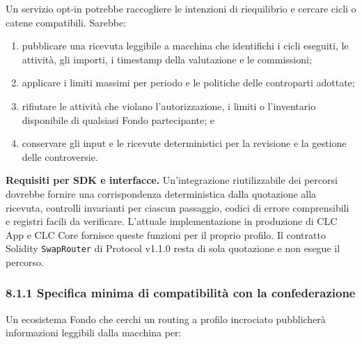 \documentclass[11pt]{article}
\begin{document}
Un servizio opt-in potrebbe raccogliere le intenzioni di riequilibrio e cercare cicli o catene compatibili. Sarebbe:

\begin{enumerate}[leftmargin=*]
\item pubblicare una ricevuta leggibile a macchina che identifichi i cicli eseguiti, le attività, gli importi, i timestamp della valutazione e le commissioni;
\item applicare i limiti massimi per periodo e le politiche delle controparti adottate;
\item rifiutare le attività che violano l'autorizzazione, i limiti o l'inventario disponibile di qualsiasi Fondo partecipante; e
\item conservare gli input e le ricevute deterministici per la revisione e la gestione delle controversie.
\end{enumerate}
\textbf{Requisiti per SDK e interfacce.} Un'integrazione riutilizzabile dei percorsi dovrebbe fornire una corrispondenza deterministica dalla quotazione alla ricevuta, controlli invarianti per ciascun passaggio, codici di errore comprensibili e registri facili da verificare. L'attuale implementazione in produzione di CLC App e CLC Core fornisce queste funzioni per il proprio profilo. Il contratto Solidity \texttt{SwapRouter} di Protocol v1.1.0 resta di sola quotazione e non esegue il percorso.

\subsubsection*{8.1.1 Specifica minima di compatibilità con la confederazione}

Un ecosistema Fondo che cerchi un routing a profilo incrociato pubblicherà informazioni leggibili dalla macchina per:
\end{document}

